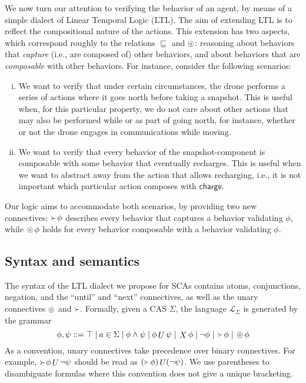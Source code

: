 \documentclass[a4paper]{article}
\newcommand{\composable}{\mathop{\ocircle}\nolimits}
\theoremstyle{definition}
\newcommand{\charge}{\mathsf{charge}}
\newcommand{\dash}{\;|\:}
\newcommand{\until}{\mathop{U}}
\newcommand{\nxt}{\mathop{X}\nolimits}
\newcommand{\captures}{\mathop{\Yright}}
\begin{document}
We now turn our attention to verifying the behavior of an agent, by means of a simple dialect of Linear Temporal Logic (LTL). The aim of extending LTL is to reflect the compositional nature of the actions. This extension has two aspects, which correspond roughly to the relations $\sqsubseteq$ and $\composable$: reasoning about behaviors that \emph{capture} (i.e., are composed of) other behaviors, and about behaviors that are \emph{composable} with other behaviors. For instance, consider the following scenarios:
\begin{enumerate}[(i)]
    \item\label{scenario:captures} We want to verify that under certain circumstances, the drone performs a series of actions where it goes north before taking a snapshot. This is useful when, for this particular property, we do not care about other actions that may also be performed while or as part of going north, for instance, whether or not the drone engages in communications while moving.
    \item\label{scenario:composable} We want to verify that every behavior of the snapshot-component is composable with some behavior that eventually recharges. This is useful when we want to abstract away from the action that allows recharging, i.e., it is not important which particular action composes with $\charge$.
\end{enumerate}
Our logic aims to accommodate both scenarios, by providing two new connectives: $\captures \phi$ describes every behavior that captures a behavior validating $\phi$, while $\composable \phi$ holds for every behavior composable with a behavior validating $\phi$.

\subsection{Syntax and semantics}%
\label{section:syntax-and-semantics}

The syntax of the LTL dialect we propose for SCAs contains atoms, conjunctions, negation, and the ``until'' and ``next'' connectives, as well as the unary connectives $\composable$ and $\captures$. Formally, given a CAS $\Sigma$, the language $\mathcal{L}_\Sigma$ is generated by the grammar
\[
\phi, \psi ::= \top \dash a \in \Sigma \dash \phi \wedge \psi \dash \phi \until \psi \dash \nxt \phi \dash \neg \phi \dash \captures \phi \dash \composable \phi
\]
As a convention, unary connectives take precedence over binary connectives. For example, $\captures \phi \until \neg \psi$ should be read as $(\captures \phi) \until (\neg \psi)$. We use parentheses to disambiguate formulas where this convention does not give a unique bracketing.
\end{document}
